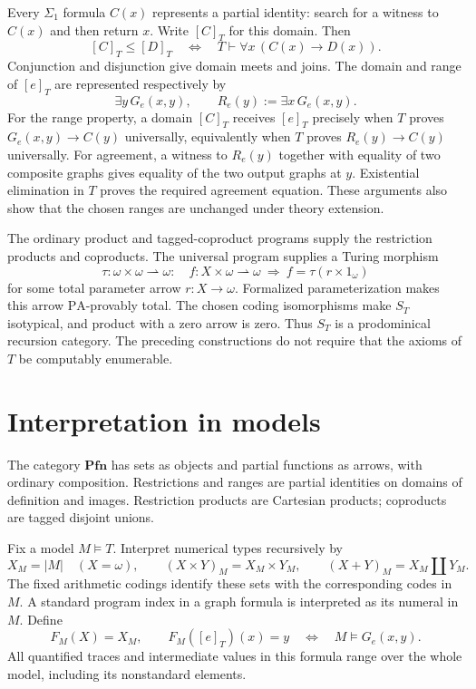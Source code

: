\documentclass[11pt]{article}
\newcommand{\PA}{\mathrm{PA}}
\newcommand{\Pfn}{\mathbf{Pfn}}
\begin{document}
Every $\Sigma_1$ formula $C(x)$ represents a partial identity: search for
a witness to $C(x)$ and then return $x$. Write $[C]_T$ for this domain.
Then
\begin{equation}\label{eq:domain-order}
 [C]_T\le[D]_T
 \quad\Longleftrightarrow\quad
 T\vdash\forall x\,(C(x)\longrightarrow D(x)).
\end{equation}
Conjunction and disjunction give domain meets and joins. The domain and
range of $[e]_T$ are represented respectively by
\[
 \exists y\,G_e(x,y),\qquad
 R_e(y):=\exists x\,G_e(x,y).
\]
For the range property, a domain $[C]_T$ receives $[e]_T$ precisely when
$T$ proves $G_e(x,y)\to C(y)$ universally, equivalently when
$T$ proves $R_e(y)\to C(y)$ universally. For agreement, a witness to
$R_e(y)$ together with equality of two composite graphs gives equality
of the two output graphs at $y$. Existential elimination in $T$ proves
the required agreement equation. These arguments also show that the
chosen ranges are unchanged under theory extension.

The ordinary product and tagged-coproduct programs supply the restriction
products and coproducts. The universal program supplies a Turing morphism
\[
 \tau:\omega\times\omega\rightharpoonup\omega:
 \quad f:X\times\omega\rightharpoonup\omega
 \ \Longrightarrow\ 
 f=\tau(r\times1_\omega)
\]
for some total parameter arrow $r:X\to\omega$. Formalized
parameterization makes this arrow $\PA$-provably total. The chosen coding
isomorphisms make $S_T$ isotypical, and product with a zero arrow is zero.
Thus $S_T$ is a prodominical recursion category. The preceding
constructions do not require that the axioms of $T$ be computably enumerable.

\section{Interpretation in models}\label{sec:models}

The category $\Pfn$ has sets as objects and partial functions as arrows,
with ordinary composition. Restrictions and ranges are partial identities
on domains of definition and images. Restriction products are Cartesian products;
coproducts are tagged disjoint unions.

Fix a model $M\models T$. Interpret numerical types recursively by
\[
 X_M=|M|\quad(X=\omega),\qquad
 (X\times Y)_M=X_M\times Y_M,\qquad
 (X+Y)_M=X_M\amalg Y_M.
\]
The fixed arithmetic codings identify these sets with the corresponding
codes in $M$. A standard program index in a graph formula is interpreted
as its numeral in $M$. Define
\begin{equation}\label{eq:model-functor}
 F_M(X)=X_M,\qquad
 F_M([e]_T)(x)=y
 \quad\Longleftrightarrow\quad M\models G_e(x,y).
\end{equation}
All quantified traces and intermediate values in this formula range over
the whole model, including its nonstandard elements.
\end{document}
